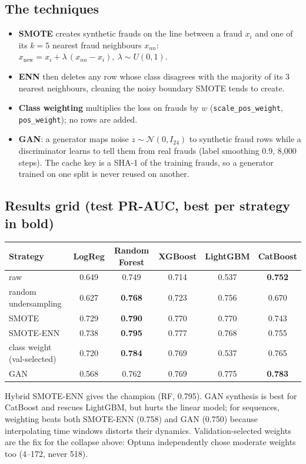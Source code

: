 \documentclass[11pt,a4paper]{article}
\begin{document}
\subsection{The techniques}
\begin{itemize}[leftmargin=1.0cm]
\item \textbf{SMOTE} creates synthetic frauds on the line between a fraud $x_i$ and one of its $k=5$
nearest fraud neighbours $x_{nn}$: \quad $x_{\text{new}} = x_i + \lambda\,(x_{nn} - x_i),\ \lambda \sim U(0,1)$.
\item \textbf{ENN} then deletes any row whose class disagrees with the majority of its 3 nearest
neighbours, cleaning the noisy boundary SMOTE tends to create.
\item \textbf{Class weighting} multiplies the loss on frauds by $w$ (\texttt{scale\_pos\_weight},
\texttt{pos\_weight}); no rows are added.
\item \textbf{GAN}: a generator maps noise $z\sim\mathcal{N}(0,I_{24})$ to synthetic fraud rows while a
discriminator learns to tell them from real frauds (label smoothing 0.9, 8,000 steps). The cache key
is a SHA-1 of the training frauds, so a generator trained on one split is never reused on another.
\end{itemize}

\subsection{Results grid (test PR-AUC, best per strategy in bold)}
{\footnotesize
\begin{center}
\begin{tabular}{@{}lccccc@{}}
\toprule
Strategy & LogReg & Random Forest & XGBoost & LightGBM & CatBoost \\
\midrule
raw & 0.649 & 0.749 & 0.714 & 0.537 & \textbf{0.752} \\
random undersampling & 0.627 & \textbf{0.768} & 0.723 & 0.756 & 0.670 \\
SMOTE & 0.729 & \textbf{0.790} & 0.770 & 0.770 & 0.743 \\
SMOTE-ENN & 0.738 & \textbf{0.795} & 0.777 & 0.768 & 0.755 \\
class weight (val-selected) & 0.720 & \textbf{0.784} & 0.769 & 0.537 & 0.765 \\
GAN & 0.568 & 0.762 & 0.769 & 0.775 & \textbf{0.783} \\
\bottomrule
\end{tabular}
\end{center}
}
Hybrid SMOTE-ENN gives the champion (RF, 0.795). GAN synthesis is best for CatBoost and rescues LightGBM,
but hurts the linear model; for sequences, weighting beats both SMOTE-ENN (0.758) and GAN (0.750)
because interpolating time windows distorts their dynamics. Validation-selected weights are the fix
for the collapse above: Optuna independently chose moderate weights too (4--172, never 518).
\end{document}
